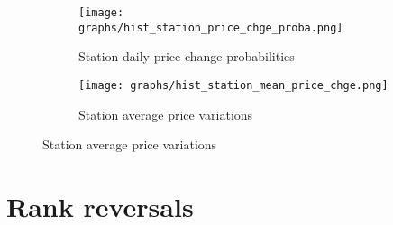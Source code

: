 \documentclass[english]{article}
\begin{document}
\begin{figure}[H]
\centering
\caption{Histograms of station price changes}
\begin{subfigure}{.49\textwidth}
\centering
\texttt{[image: graphs/hist\_station\_price\_chge\_proba.png]}
\caption[short]{Station daily price change probabilities}
\label{fig:hist_station_price_chge_proba}
\end{subfigure}
\begin{subfigure}{.49\textwidth}
\centering
\texttt{[image: graphs/hist\_station\_mean\_price\_chge.png]}
\caption[short]{Station average price variations}
\label{fig:hist_station_mean_price_chge}
\end{subfigure}
\end{figure}

\section{Rank reversals}
\end{document}
